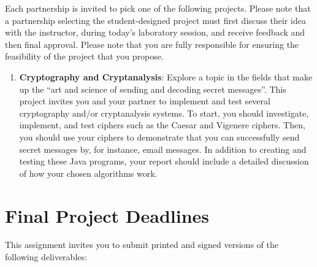Each partnership is invited to pick one of the following projects.  Please note that a partnership selecting the
student-designed project must first discuss their idea with the instructor, during today's laboratory session, and
receive feedback and then final approval.  Please note that you are fully responsible for ensuring the feasibility of
the project that you propose.

\begin{enumerate}

  \item {\bf Cryptography and Cryptanalysis}: Explore a topic in the fields that make up the ``art and science of
    sending and decoding secret messages''. This project invites you and your partner to implement and test several cryptography
    and/or cryptanalysis systems.  To start, you should investigate, implement, and test ciphers such as the Caesar and
    Vigenere ciphers. Then, you should use your ciphers to demonstrate that you can successfully send secret messages
    by, for instance, email messages. In addition to creating and testing these Java programs, your report should
    include a detailed discussion of how your chosen algorithms work.

\end{enumerate} 

\section*{Final Project Deadlines}

This assignment invites you to submit printed and signed versions of the following deliverables: 

